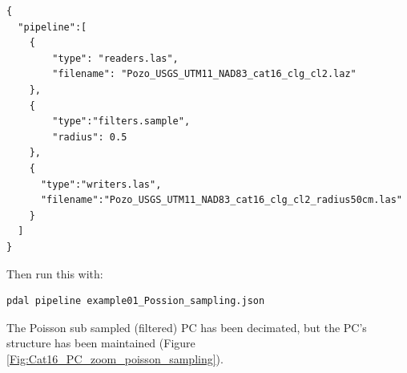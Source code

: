 \documentclass[a4paperpaper,,tablecaptionabove]{scrartcl}
\begin{document}
\begin{lstlisting}
{
  "pipeline":[
    {
        "type": "readers.las",
        "filename": "Pozo_USGS_UTM11_NAD83_cat16_clg_cl2.laz"
    },
    {
        "type":"filters.sample",
        "radius": 0.5
    },
    {
      "type":"writers.las",
      "filename":"Pozo_USGS_UTM11_NAD83_cat16_clg_cl2_radius50cm.las"
    }
  ]
}
\end{lstlisting}

Then run this with:

\begin{lstlisting}[language=bash]
pdal pipeline example01_Possion_sampling.json
\end{lstlisting}

The Poisson sub sampled (filtered) PC has been decimated, but the PC's
structure has been maintained (Figure
\ref{Fig:Cat16_PC_zoom_poisson_sampling}).
\end{document}
